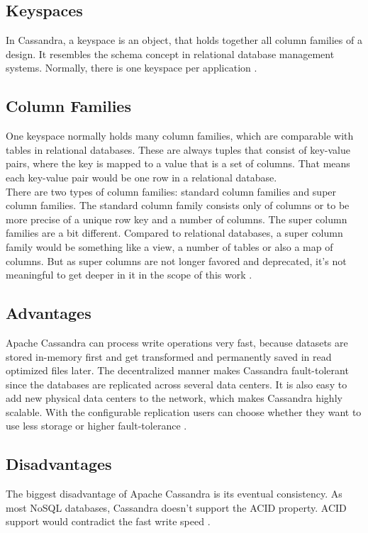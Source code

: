 \subsection{Keyspaces}
In Cassandra, a keyspace is an object, that holds together all column families of a design. It resembles the schema concept in relational database management systems. Normally, there is one keyspace per application \cite{keyspaceWiki}. 

\subsection{Column Families}
One keyspace normally holds many column families, which are comparable with tables in relational databases. These are always tuples that consist of key-value pairs, where the key is mapped to a value that is a set of columns. That means each key-value pair would be one row in a relational database. \\
There are two types of column families: standard column families and super column families. The standard column family consists only of columns or to be more precise of a unique row key and a number of columns. The super column families are a bit different. Compared to relational databases, a super column family would be something like a view, a number of tables or also a map of columns. But as super columns are not longer favored and deprecated, it's not meaningful to get deeper in it in the scope of this work \cite{columnFamWiki}.

\subsection{Advantages}
Apache Cassandra can process write operations very fast, because datasets are stored in-memory first and get transformed and permanently saved in read optimized files later. The decentralized manner makes Cassandra fault-tolerant since the databases are replicated across several data centers. It is also easy to add new physical data centers to the network, which makes Cassandra highly scalable. With the configurable replication users can choose whether they want to use less storage or higher fault-tolerance \cite{disadvantages}.

\subsection{Disadvantages}
The biggest disadvantage of Apache Cassandra is its eventual consistency. As most NoSQL databases, Cassandra doesn't support the ACID property. ACID support would contradict the fast write speed \cite{disadvantages}.

